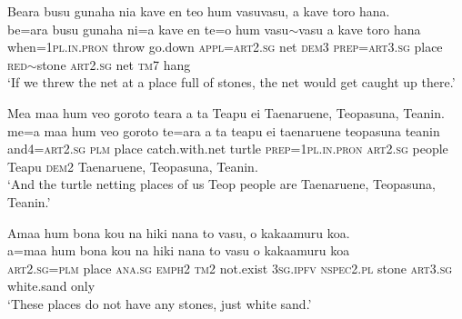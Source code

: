 \newpage
\ea\label{ex:text21-13}
Beara busu gunaha nia kave en teo hum vasuvasu, a kave toro hana.\\
\gll be=ara	busu	gunaha	ni=a	kave	en	te=o	hum	vasu{$\sim$}vasu	a	kave	toro	hana\\
     when=1\textsc{pl}.\textsc{in}.\textsc{pron}	throw	go.down	\textsc{appl}=\textsc{art}2.\textsc{sg}	net	\textsc{dem}3	\textsc{prep}=\textsc{art}3.\textsc{sg}	place	\textsc{red}{$\sim$}stone	\textsc{art}2.\textsc{sg}	net	\textsc{tm}7	hang\\
\glt `If we threw the net at a place full of stones, the net would get caught up there.'
\z

\ea\label{ex:text21-14}
Mea maa hum veo goroto teara a ta Teapu ei Taenaruene, Teopasuna, Teanin.\\
\gll me=a	maa	hum	veo	goroto	te=ara	a	ta	teapu	ei	taenaruene	teopasuna	teanin\\
     and4=\textsc{art}2.\textsc{sg}	\textsc{plm}	place	catch.with.net	turtle	\textsc{prep}=1\textsc{pl}.\textsc{in}.\textsc{pron}	\textsc{art}2.\textsc{sg}	people	Teapu	\textsc{dem}2	Taenaruene,	Teopasuna,	Teanin.\\
\glt `And the turtle netting places of us Teop people are Taenaruene, Teopasuna, Teanin.'
\z

\ea\label{ex:text21-15}
Amaa hum bona kou na hiki nana to vasu, o kakaamuru koa.\\
\gll a=maa	hum	bona	kou	na	hiki	nana	to	vasu	o	kakaamuru	koa\\
     \textsc{art}2.\textsc{sg}=\textsc{plm}	place	\textsc{ana}.\textsc{sg}	\textsc{emph}2	\textsc{tm}2	not.exist	3\textsc{sg}.\textsc{ipfv}	\textsc{nspec}2.\textsc{pl}	stone	\textsc{art}3.\textsc{sg}	white.sand	only\\
\glt `These places do not have any stones, just white sand.'
\z

